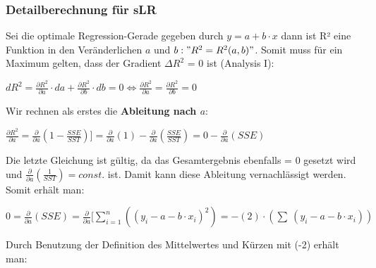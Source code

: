 \documentclass[12pt]{article}
\begin{document}
%
%
\subsubsection{Detailberechnung für sLR}
%
Sei die optimale Regression-Gerade gegeben durch $ y = a + b \cdot x $ dann ist R² eine Funktion in den Veränderlichen $a$ und $ b: " R^2 = R^2(a,b)" $. Somit muss für ein Maximum gelten, dass der Gradient $\Delta{R^2}$ = 0 ist (Analysis I): 
\begin{center}
\begin{large} 
$  dR^2 = \frac{\partial R^2}{\partial a} \cdot da + \frac{\partial R^2}{\partial b} \cdot db = 0 \Longleftrightarrow  \frac{\partial R^2}{\partial a} = \frac{\partial R^2}{\partial b} = 0 $
\end{large}
\end{center}
%
Wir rechnen als erstes die \textbf{Ableitung nach $a$}:
% 
\begin{center}
\begin{large} 
$ \frac{\partial R^2}{\partial a} = \frac{\partial}{\partial a}(1 - \frac {SSE}{SST})]  =  \frac{\partial}{\partial a}(1) - \frac{\partial}{\partial a}(\frac{SSE}{SST})= 0 -  \frac{\partial}{\partial a}(SSE) $ 
\end{large}
\end{center}
% 
Die letzte Gleichung ist gültig, da das Gesamtergebnis ebenfalls = 0 gesetzt wird und $ \frac{\partial}{\partial a}(\frac{1}{SST}) = const. $ ist. Damit kann diese Ableitung vernachlässigt werden. Somit erhält man: \\ 

\begin{center}
\begin{large} 
$ 0 = \frac{\partial}{\partial a}(SSE) = \frac{\partial}{\partial a}[\sum\limits_{i=1}^n {((y_i - a -b \cdot x_i)^2)} = -(2) \cdot (\sum\ (y_i - a - b \cdot  x_i)) $
\end{large}
\end{center}
%
Durch Benutzung der Definition des Mittelwertes und Kürzen mit (-2) erhält man: 
\end{document}
